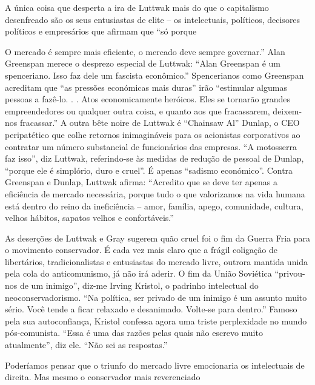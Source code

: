  \par 
A única coisa que desperta a ira de Luttwak mais do que o capitalismo desenfreado são os seus entusiastas de elite – os intelectuais, políticos, decisores políticos e empresários que afirmam que “só porque
 \par 
O mercado é sempre mais eficiente, o mercado deve sempre governar.” Alan Greenspan merece o desprezo especial de Luttwak: “Alan Greenspan é um spenceriano. Isso faz dele um fascista econômico.” Spencerianos como Greenspan acreditam que “as pressões económicas mais duras” irão “estimular algumas pessoas a fazê-lo. . . Atos economicamente heróicos. Eles se tornarão grandes empreendedores ou qualquer outra coisa, e quanto aos que fracassarem, deixem-nos fracassar.” A outra bête noire de Luttwak é “Chainsaw Al” Dunlap, o CEO peripatético que colhe retornos inimagináveis ​​para os acionistas corporativos ao contratar um número substancial de funcionários das empresas. “A motosserra faz isso”, diz Luttwak, referindo-se às medidas de redução de pessoal de Dunlap, “porque ele é simplório, duro e cruel”. É apenas “sadismo económico”. Contra Greenspan e Dunlap, Luttwak afirma: “Acredito que se deve ter apenas a eficiência de mercado necessária, porque tudo o que valorizamos na vida humana está dentro do reino da ineficiência – amor, família, apego, comunidade, cultura, velhos hábitos, sapatos velhos e confortáveis.”
 \par 
As deserções de Luttwak e Gray sugerem quão cruel foi o fim da Guerra Fria para o movimento conservador. É cada vez mais claro que a frágil coligação de libertários, tradicionalistas e entusiastas do mercado livre, outrora mantida unida pela cola do anticomunismo, já não irá aderir. O fim da União Soviética “privou-nos de um inimigo”, diz-me Irving Kristol, o padrinho intelectual do neoconservadorismo. “Na política, ser privado de um inimigo é um assunto muito sério. Você tende a ficar relaxado e desanimado. Volte-se para dentro.” Famoso pela sua autoconfiança, Kristol confessa agora uma triste perplexidade no mundo pós-comunista. “Essa é uma das razões pelas quais não escrevo muito atualmente”, diz ele. “Não sei as respostas.”
 \par 
Poderíamos pensar que o triunfo do mercado livre emocionaria os intelectuais de direita. Mas mesmo o conservador mais reverenciado
 \par 
